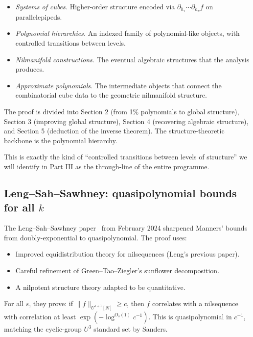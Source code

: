 \documentclass[11pt,a4paper]{article}
\theoremstyle{plain}
\theoremstyle{definition}
\theoremstyle{remark}
\begin{document}
\begin{itemize}[leftmargin=2em]
  \item \emph{Systems of cubes.} Higher-order structure encoded via $\partial_{h_1} \cdots \partial_{h_k} f$ on parallelepipeds.
  \item \emph{Polynomial hierarchies.} An indexed family of polynomial-like objects, with controlled transitions between levels.
  \item \emph{Nilmanifold constructions.} The eventual algebraic structures that the analysis produces.
  \item \emph{Approximate polynomials.} The intermediate objects that connect the combinatorial cube data to the geometric nilmanifold structure.
\end{itemize}

The proof is divided into Section 2 (from 1\% polynomials to global structure), Section 3 (improving global structure), Section 4 (recovering algebraic structure), and Section 5 (deduction of the inverse theorem). The structure-theoretic backbone is the polynomial hierarchy.

This is exactly the kind of ``controlled transitions between levels of structure'' we will identify in Part III as the through-line of the entire programme.

\subsection{Leng--Sah--Sawhney: quasipolynomial bounds for all $k$}

The Leng--Sah--Sawhney paper~\cite{lengsahsawhney2024} from February 2024 sharpened Manners' bounds from doubly-exponential to quasipolynomial. The proof uses:

\begin{itemize}[leftmargin=2em]
  \item Improved equidistribution theory for nilsequences (Leng's previous paper).
  \item Careful refinement of Green--Tao--Ziegler's sunflower decomposition.
  \item A nilpotent structure theory adapted to be quantitative.
\end{itemize}

For all $s$, they prove: if $\|f\|_{U^{s+1}[N]} \geq c$, then $f$ correlates with a nilsequence with correlation at least $\exp(-\log^{O_s(1)} c^{-1})$. This is quasipolynomial in $c^{-1}$, matching the cyclic-group $U^3$ standard set by Sanders.
\end{document}
